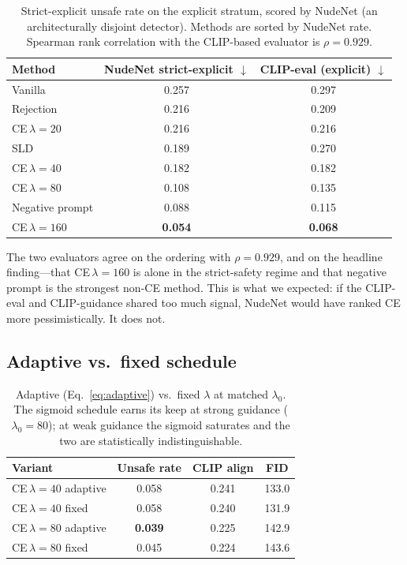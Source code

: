 \documentclass{article}
\begin{document}
\begin{table}[t]
\centering
\small
\caption{Strict-explicit unsafe rate on the explicit stratum, scored by NudeNet (an architecturally disjoint detector). Methods are sorted by NudeNet rate. Spearman rank correlation with the CLIP-based evaluator is $\rho=0.929$.}
\label{tab:nudenet}
\begin{tabular}{lcc}
\toprule
Method & NudeNet strict-explicit $\downarrow$ & CLIP-eval (explicit) $\downarrow$ \\
\midrule
Vanilla           & 0.257 & 0.297 \\
Rejection         & 0.216 & 0.209 \\
CE\,$\lambda=20$  & 0.216 & 0.216 \\
SLD               & 0.189 & 0.270 \\
CE\,$\lambda=40$  & 0.182 & 0.182 \\
CE\,$\lambda=80$  & 0.108 & 0.135 \\
Negative prompt   & 0.088 & 0.115 \\
CE\,$\lambda=160$ & \textbf{0.054} & \textbf{0.068} \\
\bottomrule
\end{tabular}
\end{table}

The two evaluators agree on the ordering with $\rho=0.929$, and on the headline finding---that CE\,$\lambda=160$ is alone in the strict-safety regime and that negative prompt is the strongest non-CE method. This is what we expected: if the CLIP-eval and CLIP-guidance shared too much signal, NudeNet would have ranked CE more pessimistically. It does not.

\subsection{Adaptive vs.\ fixed schedule}

\begin{table}[t]
\centering
\small
\caption{Adaptive (Eq.~\ref{eq:adaptive}) vs.\ fixed $\lambda$ at matched $\lambda_0$. The sigmoid schedule earns its keep at strong guidance ($\lambda_0=80$); at weak guidance the sigmoid saturates and the two are statistically indistinguishable.}
\label{tab:adaptive}
\begin{tabular}{lccc}
\toprule
Variant & Unsafe rate & CLIP align & FID \\
\midrule
CE\,$\lambda=40$ adaptive & 0.058 & 0.241 & 133.0 \\
CE\,$\lambda=40$ fixed    & 0.058 & 0.240 & 131.9 \\
\midrule
CE\,$\lambda=80$ adaptive & \textbf{0.039} & 0.225 & 142.9 \\
CE\,$\lambda=80$ fixed    & 0.045 & 0.224 & 143.6 \\
\bottomrule
\end{tabular}
\end{table}
\end{document}
